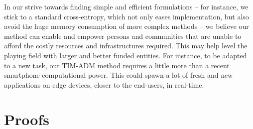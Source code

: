 \documentclass{article}
\begin{document}
    In our strive towards finding simple and efficient formulations -- for instance, we stick to a standard cross-entropy, which not only eases implementation, but also avoid the huge memory consumption of more complex methods -- we believe our method can enable and empower persons and communities that are unable to afford the costly resources and infrastructures required. This may help level the playing field with larger and better funded entities. For instance, to be adapted to a new task, our TIM-ADM method requires a little more than a recent smartphone computational power. This could spawn a lot of fresh and new applications on edge devices, closer to the end-users, in real-time. \clearpage





\clearpage
\appendix
\section{Proofs}\label{sec:proofs}
\end{document}
